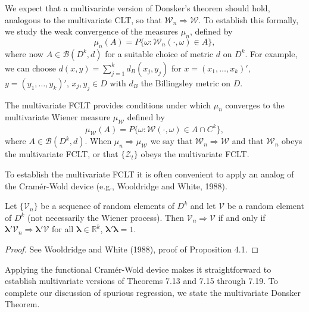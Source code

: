 We expect that a multivariate version of Donsker's theorem should hold, analogous to the multivariate CLT, so that $\boldsymbol{\mathcal{W}}_n \Rightarrow \boldsymbol{\mathcal{W}}$. To establish this formally, we study the weak convergence of the measures $\mu_n$, defined by
\[
\mu_n(A) = P\{\omega : \boldsymbol{\mathcal{W}}_n(\cdot, \omega) \in A\},
\]
where now $A \in \mathcal{B}(D^k, d)$ for a suitable choice of metric $d$ on $D^k$. For example, we can choose $d(x,y) = \sum_{j=1}^{k} d_B(x_j, y_j)$ for $x = (x_1, \ldots, x_k)'$, $y = (y_1, \ldots, y_k)'$, $x_j, y_j \in D$ with $d_B$ the Billingsley metric on $D$.

The multivariate FCLT provides conditions under which $\mu_n$ converges to the multivariate Wiener measure $\mu_{\boldsymbol{\mathcal{W}}}$ defined by
\[
\mu_{\boldsymbol{\mathcal{W}}}(A) = P\{\omega : \boldsymbol{\mathcal{W}}(\cdot, \omega) \in A \cap C^k\},
\]
where $A \in \mathcal{B}(D^k, d)$. When $\mu_n \Rightarrow \mu_{\boldsymbol{\mathcal{W}}}$ we say that $\boldsymbol{\mathcal{W}}_n \Rightarrow \boldsymbol{\mathcal{W}}$ and that $\boldsymbol{\mathcal{W}}_n$ obeys the multivariate FCLT, or that $\{\boldsymbol{\mathcal{Z}}_t\}$ obeys the multivariate FCLT.

To establish the multivariate FCLT it is often convenient to apply an analog of the Cram\'{e}r-Wold device (e.g., Wooldridge and White, 1988).

\begin{proposition}\label{prop:functional-cramer-wold}
Let $\{\boldsymbol{\mathcal{V}}_n\}$ be a sequence of random elements of $D^k$ and let $\boldsymbol{\mathcal{V}}$ be a random element of $D^k$ (not necessarily the Wiener process). Then $\boldsymbol{\mathcal{V}}_n \Rightarrow \boldsymbol{\mathcal{V}}$ if and only if $\boldsymbol{\lambda}'\boldsymbol{\mathcal{V}}_n \Rightarrow \boldsymbol{\lambda}'\boldsymbol{\mathcal{V}}$ for all $\boldsymbol{\lambda} \in \mathbb{R}^k$, $\boldsymbol{\lambda}'\boldsymbol{\lambda} = 1$.
\end{proposition}

\begin{proof}
See Wooldridge and White (1988), proof of Proposition 4.1.
\end{proof}

Applying the functional Cram\'{e}r-Wold device makes it straightforward to establish multivariate versions of Theorems 7.13 and 7.15 through 7.19. To complete our discussion of spurious regression, we state the multivariate Donsker Theorem.

